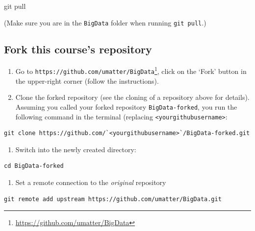 \documentclass[
  12pt,
]{style/krantz}
\newenvironment{Shaded}{\begin{snugshade}}{\end{snugshade}}
\newcommand{\FunctionTok}[1]{\textcolor[rgb]{0.00,0.00,0.00}{#1}}
\newcommand{\NormalTok}[1]{#1}
\providecommand{\tightlist}{%
  \setlength{\itemsep}{0pt}\setlength{\parskip}{0pt}}
\renewcommand{\href}[2]{#2\footnote{\url{#1}}}
\begin{document}
\begin{Shaded}
\begin{Highlighting}[]
\FunctionTok{git}\NormalTok{ pull}
\end{Highlighting}
\end{Shaded}

(Make sure you are in the \texttt{BigData} folder when running \texttt{git\ pull}.)

\hypertarget{fork-this-courses-repository}{%
\subsection{Fork this course's repository}\label{fork-this-courses-repository}}

\begin{enumerate}
\def\labelenumi{\arabic{enumi}.}
\item
  Go to \href{https://github.com/umatter/BigData}{\texttt{https://github.com/umatter/BigData}}, click on the `Fork' button in the upper-right corner (follow the instructions).
\item
  Clone the forked repository (see the cloning of a repository above for details). Assuming you called your forked repository \texttt{BigData-forked}, you run the following command in the terminal (replacing \texttt{\textless{}yourgithubusername\textgreater{}}:
\end{enumerate}

\begin{verbatim}
git clone https://github.com/`<yourgithubusername>`/BigData-forked.git
\end{verbatim}

\begin{enumerate}
\def\labelenumi{\arabic{enumi}.}
\setcounter{enumi}{2}
\tightlist
\item
  Switch into the newly created directory:
\end{enumerate}

\begin{verbatim}
cd BigData-forked
\end{verbatim}

\begin{enumerate}
\def\labelenumi{\arabic{enumi}.}
\setcounter{enumi}{3}
\tightlist
\item
  Set a remote connection to the \emph{original} repository
\end{enumerate}

\begin{verbatim}
git remote add upstream https://github.com/umatter/BigData.git
\end{verbatim}
\end{document}
